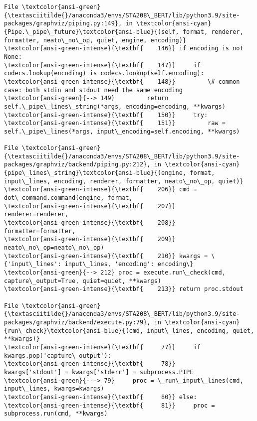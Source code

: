 \documentclass[11pt]{article}
\begin{document}
\begin{Verbatim}[commandchars=\\\{\}, frame=single, framerule=2mm, rulecolor=\color{outerrorbackground}]
File \textcolor{ansi-green}{\textasciitilde{}/anaconda3/envs/STA208\_BERT/lib/python3.9/site-packages/graphviz/piping.py:149}, in \textcolor{ansi-cyan}{Pipe.\_pipe\_future}\textcolor{ansi-blue}{(self, format, renderer, formatter, neato\_no\_op, quiet, engine, encoding)}
\textcolor{ansi-green-intense}{\textbf{    146}} if encoding is not None:
\textcolor{ansi-green-intense}{\textbf{    147}}     if codecs.lookup(encoding) is codecs.lookup(self.encoding):
\textcolor{ansi-green-intense}{\textbf{    148}}         \# common case: both stdin and stdout need the same encoding
\textcolor{ansi-green}{--> 149}         return self.\_pipe\_lines\_string(*args, encoding=encoding, **kwargs)
\textcolor{ansi-green-intense}{\textbf{    150}}     try:
\textcolor{ansi-green-intense}{\textbf{    151}}         raw = self.\_pipe\_lines(*args, input\_encoding=self.encoding, **kwargs)

File \textcolor{ansi-green}{\textasciitilde{}/anaconda3/envs/STA208\_BERT/lib/python3.9/site-packages/graphviz/backend/piping.py:212}, in \textcolor{ansi-cyan}{pipe\_lines\_string}\textcolor{ansi-blue}{(engine, format, input\_lines, encoding, renderer, formatter, neato\_no\_op, quiet)}
\textcolor{ansi-green-intense}{\textbf{    206}} cmd = dot\_command.command(engine, format,
\textcolor{ansi-green-intense}{\textbf{    207}}                           renderer=renderer,
\textcolor{ansi-green-intense}{\textbf{    208}}                           formatter=formatter,
\textcolor{ansi-green-intense}{\textbf{    209}}                           neato\_no\_op=neato\_no\_op)
\textcolor{ansi-green-intense}{\textbf{    210}} kwargs = \{'input\_lines': input\_lines, 'encoding': encoding\}
\textcolor{ansi-green}{--> 212} proc = execute.run\_check(cmd, capture\_output=True, quiet=quiet, **kwargs)
\textcolor{ansi-green-intense}{\textbf{    213}} return proc.stdout

File \textcolor{ansi-green}{\textasciitilde{}/anaconda3/envs/STA208\_BERT/lib/python3.9/site-packages/graphviz/backend/execute.py:79}, in \textcolor{ansi-cyan}{run\_check}\textcolor{ansi-blue}{(cmd, input\_lines, encoding, quiet, **kwargs)}
\textcolor{ansi-green-intense}{\textbf{     77}}     if kwargs.pop('capture\_output'):
\textcolor{ansi-green-intense}{\textbf{     78}}         kwargs['stdout'] = kwargs['stderr'] = subprocess.PIPE
\textcolor{ansi-green}{---> 79}     proc = \_run\_input\_lines(cmd, input\_lines, kwargs=kwargs)
\textcolor{ansi-green-intense}{\textbf{     80}} else:
\textcolor{ansi-green-intense}{\textbf{     81}}     proc = subprocess.run(cmd, **kwargs)


\end{Verbatim}
\end{document}
